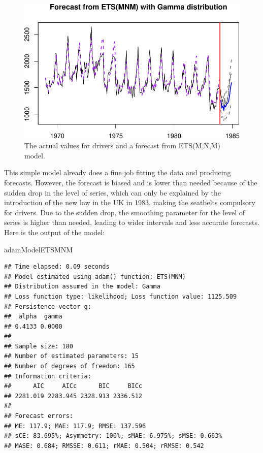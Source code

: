 \documentclass[
]{book}
\newenvironment{Shaded}{\begin{snugshade}}{\end{snugshade}}
\newcommand{\NormalTok}[1]{#1}
\theoremstyle{definition}
\theoremstyle{definition}
\theoremstyle{definition}
\theoremstyle{definition}
\theoremstyle{remark}
\begin{document}
\begin{figure}
\centering
\includegraphics{Svetunkov--2022----ADAM_files/figure-latex/SeatbeltsForecast-1.pdf}
\caption{\label{fig:SeatbeltsForecast}The actual values for drivers and a forecast from ETS(M,N,M) model.}
\end{figure}

This simple model already does a fine job fitting the data and producing forecasts. However, the forecast is biased and is lower than needed because of the sudden drop in the level of series, which can only be explained by the introduction of the new law in the UK in 1983, making the seatbelts compulsory for drivers. Due to the sudden drop, the smoothing parameter for the level of series is higher than needed, leading to wider intervals and less accurate forecasts. Here is the output of the model:

\begin{Shaded}
\begin{Highlighting}[]
\NormalTok{adamModelETSMNM}
\end{Highlighting}
\end{Shaded}

\begin{verbatim}
## Time elapsed: 0.09 seconds
## Model estimated using adam() function: ETS(MNM)
## Distribution assumed in the model: Gamma
## Loss function type: likelihood; Loss function value: 1125.509
## Persistence vector g:
##  alpha  gamma 
## 0.4133 0.0000 
## 
## Sample size: 180
## Number of estimated parameters: 15
## Number of degrees of freedom: 165
## Information criteria:
##      AIC     AICc      BIC     BICc 
## 2281.019 2283.945 2328.913 2336.512 
## 
## Forecast errors:
## ME: 117.9; MAE: 117.9; RMSE: 137.596
## sCE: 83.695%; Asymmetry: 100%; sMAE: 6.975%; sMSE: 0.663%
## MASE: 0.684; RMSSE: 0.611; rMAE: 0.504; rRMSE: 0.542
\end{verbatim}
\end{document}
